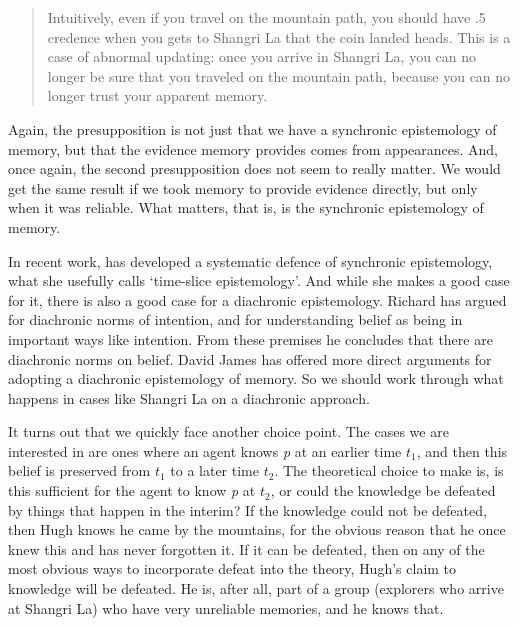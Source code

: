 \begin{quote}
Intuitively, even if you travel on the mountain path, you should have .5 credence when you gets to Shangri La that the coin landed heads. This is a case of abnormal updating: once you arrive in Shangri La, you can no longer be sure that you traveled on the mountain path, because you can no longer trust your apparent memory. ~\citep[241-2]{Moss2012}
\end{quote}
Again, the presupposition is not just that we have a synchronic epistemology of memory, but that the evidence memory provides comes from appearances. And, once again, the second presupposition does not seem to really matter. We would get the same result if we took memory to provide evidence directly, but only when it was reliable. What matters, that is, is the synchronic epistemology of memory.

In recent work, \citet{Moss2015} has developed a systematic defence of synchronic epistemology, what she usefully calls `time-slice epistemology'. And while she makes a good case for it, there is also a good case for a diachronic epistemology. Richard \citet{Holton1999, Holton2014} has argued for diachronic norms of intention, and for understanding belief as being in important ways like intention. From these premises he concludes that there are diachronic norms on belief. David James \citet{Barnett2015} has offered more direct arguments for adopting a diachronic epistemology of memory. So we should work through what happens in cases like Shangri La on a diachronic approach.

It turns out that we quickly face another choice point. The cases we are interested in are ones where an agent knows \emph{p} at an earlier time $t_1$, and then this belief is preserved from $t_1$ to a later time $t_2$. The theoretical choice to make is, is this sufficient for the agent to know \emph{p} at $t_2$, or could the knowledge be defeated by things that happen in the interim? If the knowledge could not be defeated, then \gls{Hugh} knows he came by the mountains, for the obvious reason that he once knew this and has never forgotten it. If it can be defeated, then on any of the most obvious ways to incorporate defeat into the theory, \gls{Hugh}'s claim to knowledge will be defeated. He is, after all, part of a group (explorers who arrive at Shangri La) who have very unreliable memories, and he knows that.

